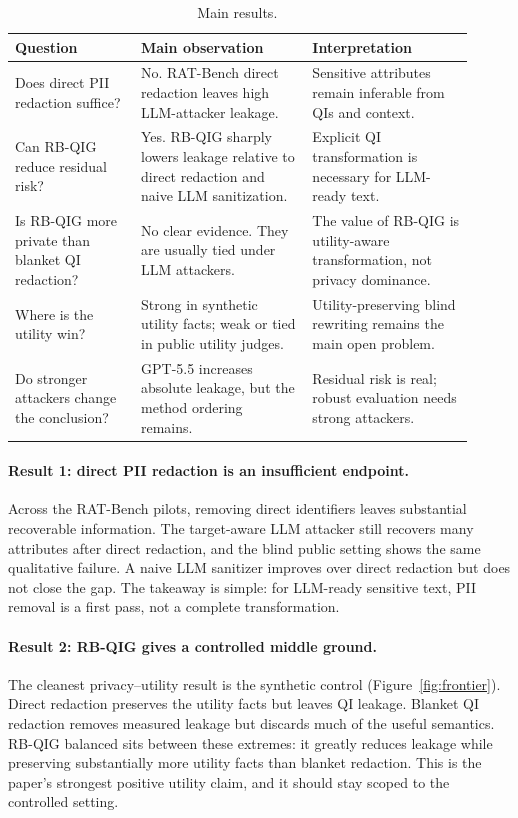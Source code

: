 \documentclass{article}
\begin{document}
\begin{table}[t]
\centering
\small
\caption{Main results.}
\label{tab:headline}
\begingroup
\renewcommand{\arraystretch}{1.5}
\begin{tabular}{p{0.25\linewidth}p{0.34\linewidth}p{0.32\linewidth}}
\toprule
Question & Main observation & Interpretation \\
\midrule
Does direct PII redaction suffice? &
No. RAT-Bench direct redaction leaves high LLM-attacker leakage. &
Sensitive attributes remain inferable from QIs and context. \\
Can RB-QIG reduce residual risk? &
Yes. RB-QIG sharply lowers leakage relative to direct redaction and naive LLM sanitization. &
Explicit QI transformation is necessary for LLM-ready text. \\
Is RB-QIG more private than blanket QI redaction? &
No clear evidence. They are usually tied under LLM attackers. &
The value of RB-QIG is utility-aware transformation, not privacy dominance. \\
Where is the utility win? &
Strong in synthetic utility facts; weak or tied in public utility judges. &
Utility-preserving blind rewriting remains the main open problem. \\
Do stronger attackers change the conclusion? &
GPT-5.5 increases absolute leakage, but the method ordering remains. &
Residual risk is real; robust evaluation needs strong attackers. \\
\bottomrule
\end{tabular}
\endgroup
\end{table}

\paragraph{Result 1: direct PII redaction is an insufficient endpoint.}
Across the RAT-Bench pilots, removing direct identifiers leaves substantial
recoverable information. The target-aware LLM attacker still recovers many
attributes after direct redaction, and the blind public setting shows the same
qualitative failure. A naive LLM sanitizer improves over direct redaction but
does not close the gap. The takeaway is simple: for LLM-ready sensitive text,
PII removal is a first pass, not a complete transformation.

\paragraph{Result 2: RB-QIG gives a controlled middle ground.}
The cleanest privacy--utility result is the synthetic control
(Figure~\ref{fig:frontier}). Direct redaction preserves the utility facts but
leaves QI leakage. Blanket QI redaction removes measured leakage but discards
much of the useful semantics. RB-QIG balanced sits between these extremes: it
greatly reduces leakage while preserving substantially more utility facts than
blanket redaction. This is the paper's strongest positive utility claim, and
it should stay scoped to the controlled setting.
\end{document}

